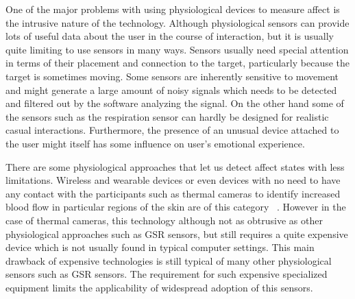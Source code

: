 One of the major problems with using physiological devices to measure affect is the intrusive nature of the technology. Although physiological sensors can provide lots of useful data about the user in the course of interaction, but  it is usually quite limiting to use sensors in many ways. Sensors usually need special attention in terms of their placement and connection to the target, particularly because the target is sometimes moving. Some sensors are inherently sensitive to movement and might generate a large amount of noisy signals which needs to be detected and filtered out by the software analyzing the signal. On the other hand some of the sensors such as the respiration sensor can hardly be designed for realistic casual interactions. Furthermore, the presence of an unusual device attached to the user might itself has some influence on user's emotional experience.

There are some physiological approaches that let us detect affect states with less limitations. Wireless and wearable devices or even devices with no need to have any contact with the participants such as thermal cameras to identify increased blood flow in particular regions of the skin are of this category ~\cite{puri2005stresscam}. However in the case of thermal cameras, this technology although not as obtrusive as other physiological approaches such as GSR sensors, but still requires a quite expensive device which is not usually found in typical computer settings. This main drawback of expensive technologies is still typical of many other physiological sensors such as GSR sensors. The requirement for such expensive specialized equipment limits the applicability of widespread adoption of this sensors. 
